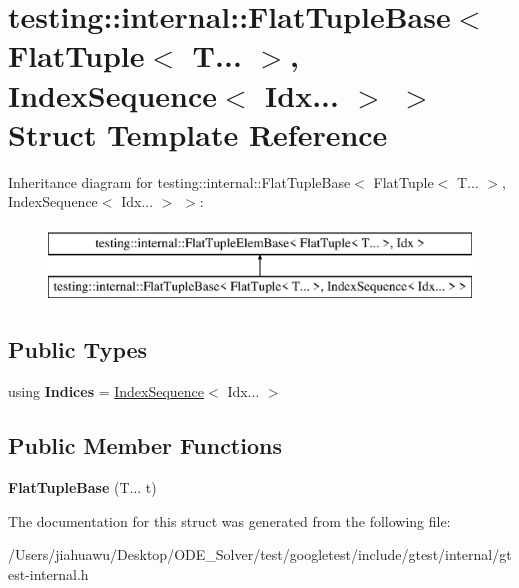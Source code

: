 \hypertarget{structtesting_1_1internal_1_1_flat_tuple_base_3_01_flat_tuple_3_01_t_8_8_8_01_4_00_01_index_sequence_3_01_idx_8_8_8_01_4_01_4}{}\section{testing\+:\+:internal\+:\+:Flat\+Tuple\+Base$<$ Flat\+Tuple$<$ T... $>$, Index\+Sequence$<$ Idx... $>$ $>$ Struct Template Reference}
\label{structtesting_1_1internal_1_1_flat_tuple_base_3_01_flat_tuple_3_01_t_8_8_8_01_4_00_01_index_sequence_3_01_idx_8_8_8_01_4_01_4}
Inheritance diagram for testing\+:\+:internal\+:\+:Flat\+Tuple\+Base$<$ Flat\+Tuple$<$ T... $>$, Index\+Sequence$<$ Idx... $>$ $>$\+:\begin{figure}[H]
\begin{center}
\leavevmode
\includegraphics[height=2.000000cm]{structtesting_1_1internal_1_1_flat_tuple_base_3_01_flat_tuple_3_01_t_8_8_8_01_4_00_01_index_sequence_3_01_idx_8_8_8_01_4_01_4}
\end{center}
\end{figure}
\subsection*{Public Types}
\begin{DoxyCompactItemize}
\item 
\mbox{\label{structtesting_1_1internal_1_1_flat_tuple_base_3_01_flat_tuple_3_01_t_8_8_8_01_4_00_01_index_sequence_3_01_idx_8_8_8_01_4_01_4_ada1941ebde1ec1c844b72970e0ccb304}} 
using {\bfseries Indices} = \mbox{\hyperlink{structtesting_1_1internal_1_1_index_sequence}{Index\+Sequence}}$<$ Idx... $>$
\end{DoxyCompactItemize}
\subsection*{Public Member Functions}
\begin{DoxyCompactItemize}
\item 
\mbox{\label{structtesting_1_1internal_1_1_flat_tuple_base_3_01_flat_tuple_3_01_t_8_8_8_01_4_00_01_index_sequence_3_01_idx_8_8_8_01_4_01_4_ac515eec5c0647748bf8fa4ff553c706e}} 
{\bfseries Flat\+Tuple\+Base} (T... t)
\end{DoxyCompactItemize}


The documentation for this struct was generated from the following file\+:\begin{DoxyCompactItemize}
\item 
/\+Users/jiahuawu/\+Desktop/\+O\+D\+E\+\_\+\+Solver/test/googletest/include/gtest/internal/gtest-\/internal.\+h\end{DoxyCompactItemize}
